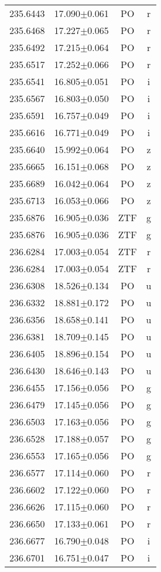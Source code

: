\begin{table}
\begin{tabular}{cccc}
235.6443 & 17.090$\pm$0.061 & PO & r \\
235.6468 & 17.227$\pm$0.065 & PO & r \\
235.6492 & 17.215$\pm$0.064 & PO & r \\
235.6517 & 17.252$\pm$0.066 & PO & r \\
235.6541 & 16.805$\pm$0.051 & PO & i \\
235.6567 & 16.803$\pm$0.050 & PO & i \\
235.6591 & 16.757$\pm$0.049 & PO & i \\
235.6616 & 16.771$\pm$0.049 & PO & i \\
235.6640 & 15.992$\pm$0.064 & PO & z \\
235.6665 & 16.151$\pm$0.068 & PO & z \\
235.6689 & 16.042$\pm$0.064 & PO & z \\
235.6713 & 16.053$\pm$0.066 & PO & z \\
235.6876 & 16.905$\pm$0.036 & ZTF & g \\
235.6876 & 16.905$\pm$0.036 & ZTF & g \\
236.6284 & 17.003$\pm$0.054 & ZTF & r \\
236.6284 & 17.003$\pm$0.054 & ZTF & r \\
236.6308 & 18.526$\pm$0.134 & PO & u \\
236.6332 & 18.881$\pm$0.172 & PO & u \\
236.6356 & 18.658$\pm$0.141 & PO & u \\
236.6381 & 18.709$\pm$0.145 & PO & u \\
236.6405 & 18.896$\pm$0.154 & PO & u \\
236.6430 & 18.646$\pm$0.143 & PO & u \\
236.6455 & 17.156$\pm$0.056 & PO & g \\
236.6479 & 17.145$\pm$0.056 & PO & g \\
236.6503 & 17.163$\pm$0.056 & PO & g \\
236.6528 & 17.188$\pm$0.057 & PO & g \\
236.6553 & 17.165$\pm$0.056 & PO & g \\
236.6577 & 17.114$\pm$0.060 & PO & r \\
236.6602 & 17.122$\pm$0.060 & PO & r \\
236.6626 & 17.115$\pm$0.060 & PO & r \\
236.6650 & 17.133$\pm$0.061 & PO & r \\
236.6677 & 16.790$\pm$0.048 & PO & i \\
236.6701 & 16.751$\pm$0.047 & PO & i \\

\end{tabular}
\end{table}
